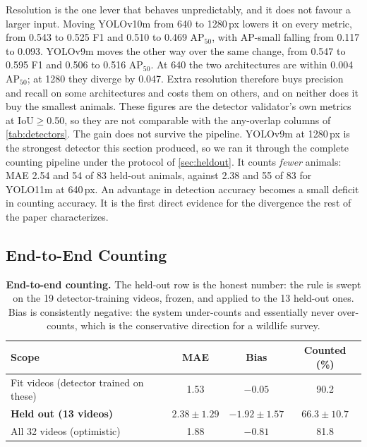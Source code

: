 Resolution is the one lever that behaves unpredictably, and it does not favour a larger
input. Moving YOLOv10m from 640 to 1280\,px lowers it on every metric, from 0.543 to 0.525
F1 and 0.510 to 0.469 AP$_{50}$, with AP-small falling from 0.117 to 0.093. YOLOv9m moves
the other way over the same change, from 0.547 to 0.595 F1 and 0.506 to 0.516 AP$_{50}$.
At 640 the two architectures are within 0.004 AP$_{50}$; at 1280 they diverge by 0.047.
Extra resolution therefore buys precision and recall on some architectures and costs them
on others, and on neither does it buy the smallest animals. These figures are the detector validator's own metrics at IoU$\geq$0.50, so they are not comparable with the any-overlap columns of \cref{tab:detectors}. The gain does not survive the pipeline. YOLOv9m at
1280\,px is the strongest detector this section produced, so we ran it through the
complete counting pipeline under the protocol of \cref{sec:heldout}. It counts \emph{fewer}
animals: MAE 2.54 and 54 of 83 held-out animals, against 2.38 and 55 of 83 for YOLO11m at
640\,px. An advantage in detection accuracy becomes a small deficit in counting accuracy.
It is the first direct evidence for the divergence the rest of the paper characterizes.

\subsection{End-to-End Counting}
\label{sec:counting}

\begin{table}[htbp]
\caption{\textbf{End-to-end counting.} The held-out row is the honest number: the rule is
swept on the 19 detector-training videos, frozen, and applied to the 13 held-out ones. Bias is consistently negative: the system under-counts and essentially never over-counts, which
is the conservative direction for a wildlife survey.\label{tab:counting}}
\centering
\begin{tabularx}{\textwidth}{lCCC}
\toprule
\textbf{Scope} & \textbf{MAE} & \textbf{Bias} & \textbf{Counted (\%)} \\
\midrule
Fit videos (detector trained on these) & 1.53 & $-0.05$ & 90.2 \\
\textbf{Held out (13 videos)} & $\mathbf{2.38 \pm 1.29}$ & $\mathbf{-1.92 \pm 1.57}$ & $\mathbf{66.3 \pm 10.7}$ \\
All 32 videos (optimistic) & 1.88 & $-0.81$ & 81.8 \\
\bottomrule
\end{tabularx}
\end{table}

